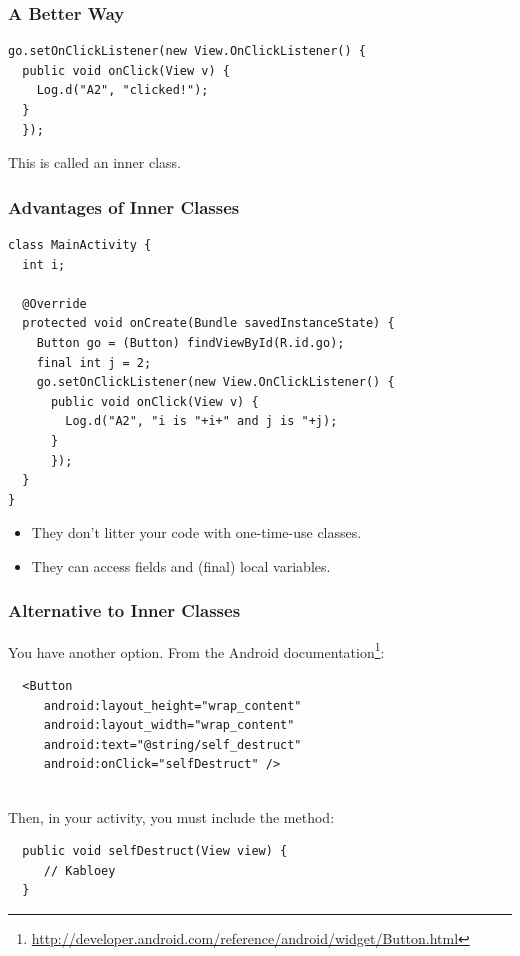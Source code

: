\begin{frame}[fragile]
\frametitle{A Better Way}

\begin{changemargin}{1.5cm}

{\small
\begin{verbatim}
go.setOnClickListener(new View.OnClickListener() {
  public void onClick(View v) {
    Log.d("A2", "clicked!");
  }
  }); 
\end{verbatim}
}

{\Large This is called an \alert{inner class}.}

\end{changemargin}
\end{frame}

\begin{frame}[fragile]
\frametitle{Advantages of Inner Classes}

{\small
\begin{verbatim}
class MainActivity {
  int i;

  @Override
  protected void onCreate(Bundle savedInstanceState) {
    Button go = (Button) findViewById(R.id.go);
    final int j = 2;
    go.setOnClickListener(new View.OnClickListener() {
      public void onClick(View v) {
        Log.d("A2", "i is "+i+" and j is "+j);
      }
      }); 
  }
}
\end{verbatim}
}

\begin{changemargin}{1.5cm}
\begin{itemize}
\item They don't litter your code with one-time-use classes.
\item They can access fields and (final) local variables.
\end{itemize}
\end{changemargin}

\end{frame}

\begin{frame}[fragile]
\frametitle{Alternative to Inner Classes}

\begin{changemargin}{1cm}
You have another option. From the Android documentation\footnote{\tiny \url{http://developer.android.com/reference/android/widget/Button.html}}:
\begin{verbatim}
  <Button
     android:layout_height="wrap_content"
     android:layout_width="wrap_content"
     android:text="@string/self_destruct"
     android:onClick="selfDestruct" />
\end{verbatim}
~\\[1em]

Then, in your activity, you must include the method:
\begin{verbatim}
  public void selfDestruct(View view) {
     // Kabloey
  }
\end{verbatim}
\end{changemargin}

\end{frame}

